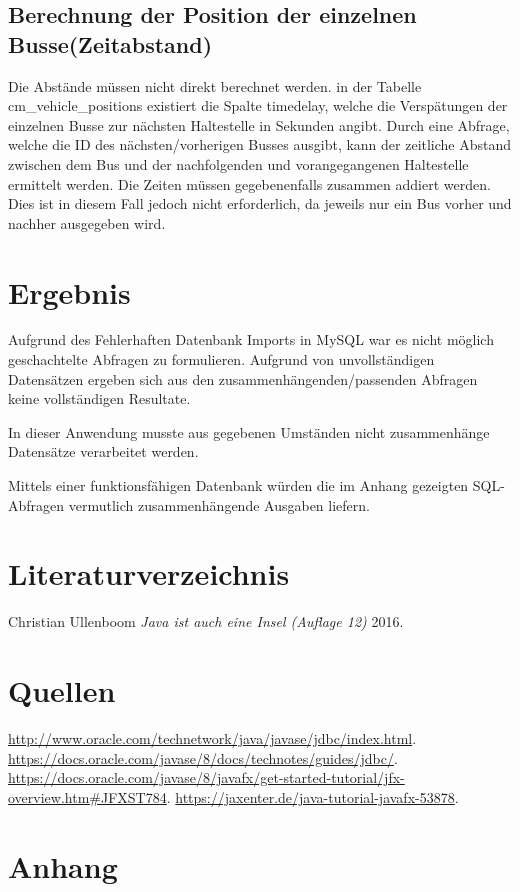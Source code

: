 \documentclass[a4paper, 12pt]{scrartcl}
\begin{document}
\subsection{Berechnung der Position der einzelnen Busse(Zeitabstand)}
Die Abstände müssen nicht direkt berechnet werden. in der Tabelle cm\_vehicle\_positions existiert die Spalte timedelay, welche die Verspätungen der einzelnen Busse zur nächsten Haltestelle in Sekunden angibt. Durch eine Abfrage, welche die ID des nächsten/vorherigen Busses ausgibt, kann der zeitliche Abstand zwischen dem Bus und der nachfolgenden und vorangegangenen Haltestelle ermittelt werden. Die Zeiten müssen gegebenenfalls zusammen addiert werden. Dies ist in diesem Fall jedoch nicht erforderlich, da jeweils nur ein Bus vorher und nachher ausgegeben wird.

\section{Ergebnis}
Aufgrund des Fehlerhaften Datenbank Imports in MySQL war es 
nicht möglich geschachtelte Abfragen zu formulieren. Aufgrund von unvollständigen Datensätzen ergeben sich aus den zusammenhängenden/passenden Abfragen keine vollständigen Resultate.

In dieser Anwendung musste aus gegebenen Umständen nicht zusammenhänge Datensätze verarbeitet werden.

Mittels einer funktionsfähigen Datenbank würden die im Anhang gezeigten SQL-Abfragen vermutlich zusammenhängende Ausgaben liefern.



\section{Literaturverzeichnis}
\begin{thebibliography}{1}

   Christian Ullenboom {\em Java ist auch eine Insel (Auflage 12)} 2016.

\end{thebibliography}

\section{Quellen}
\newline\href{http://www.oracle.com/technetwork/java/javase/jdbc/index.html}{http://www.oracle.com/technetwork/java/javase/jdbc/index.html}.
\newline\href{https://docs.oracle.com/javase/8/docs/technotes/guides/jdbc/}{https://docs.oracle.com/javase/8/docs/technotes/guides/jdbc/}.
\newline\href{https://docs.oracle.com/javase/8/javafx/get-started-tutorial/jfx-overview.htm#JFXST784}{https://docs.oracle.com/javase/8/javafx/get-started-tutorial/jfx-overview.htm#JFXST784}.
\newline\href{https://jaxenter.de/java-tutorial-javafx-53878}{https://jaxenter.de/java-tutorial-javafx-53878}.

\section{Anhang}
 
\end{document}
